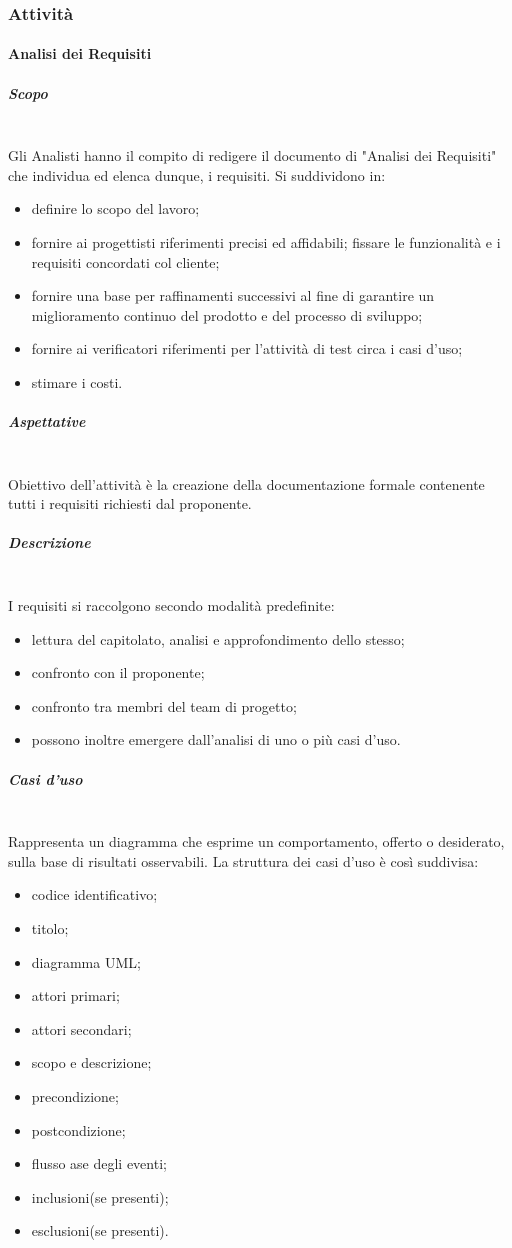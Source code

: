 \subsubsection{Attività}
\paragraph{Analisi dei Requisiti}
\subparagraph{Scopo} \mbox{}\\
Gli Analisti hanno il compito di redigere il documento di
"Analisi dei Requisiti" che individua ed elenca dunque, i requisiti.
Si suddividono in:
\begin{itemize}
	\item definire lo scopo del lavoro;
	\item fornire ai progettisti riferimenti precisi ed affidabili;
	fissare le funzionalità e i requisiti concordati col cliente;
	\item fornire  una  base  per  raffinamenti  successivi  al  fine  di  garantire  un miglioramento continuo del prodotto e del processo di sviluppo;
	\item fornire ai verificatori riferimenti per l’attività di test circa i casi d’uso;
	\item stimare i costi.
\end{itemize}
\subparagraph{Aspettative} \mbox{}\\
Obiettivo dell’attività è la creazione della documentazione formale contenente tutti i
requisiti richiesti dal proponente.
\subparagraph{Descrizione} \mbox{}\\
I requisiti si raccolgono secondo modalità predefinite:
\begin{itemize}
	\item lettura del capitolato, analisi e approfondimento dello stesso;
	\item confronto con il proponente;
	\item confronto tra membri del team di progetto;
	\item possono inoltre emergere dall'analisi di uno o più casi d'uso.
\end{itemize}
\subparagraph{Casi d'uso} \mbox{}\\
Rappresenta un diagramma che esprime un comportamento,
offerto o desiderato, sulla base di risultati osservabili.
La struttura dei casi d'uso è così suddivisa:
\begin{itemize}
	\item codice identificativo;
	\item titolo;
	\item diagramma UML;
	\item attori primari;
	\item attori secondari;
	\item scopo e descrizione;
	\item precondizione;
	\item postcondizione;
	\item flusso ase degli eventi;
	\item inclusioni(se presenti);
	\item esclusioni(se presenti).
\end{itemize}

